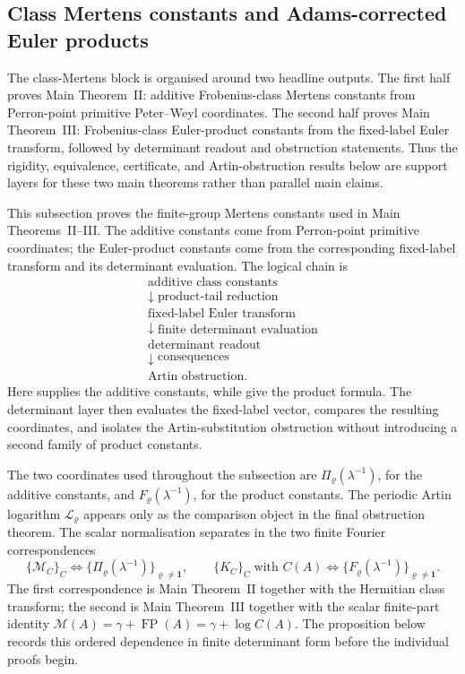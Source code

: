 \documentclass[11pt,a4paper]{amsart}
\theoremstyle{plain}
\theoremstyle{definition}
\theoremstyle{remark}
\DeclareMathOperator{\FP}{FP}
\begin{document}
\subsection{Class Mertens constants and Adams-corrected Euler products}
\label{subsec:class-mertens-adams-products}

The class-Mertens block is organised around two headline outputs.  The first
half proves Main Theorem~II: additive Frobenius-class Mertens constants from
Perron-point primitive Peter--Weyl coordinates.  The second half proves Main
Theorem~III: Frobenius-class Euler-product constants from the fixed-label
Euler transform, followed by determinant readout and obstruction statements.
Thus the rigidity, equivalence, certificate, and Artin-obstruction results
below are support layers for these two main theorems rather than parallel main
claims.

This subsection proves the finite-group Mertens constants used in Main
Theorems~II--III.  The additive constants come from Perron-point primitive
coordinates; the Euler-product constants come from the corresponding
fixed-label transform and its determinant evaluation.  The logical chain is
\[
\begin{array}{c}
  \text{additive class constants}\\
  \downarrow\;\text{product-tail reduction}\\
  \text{fixed-label Euler transform}\\
  \downarrow\;\text{finite determinant evaluation}\\
  \text{determinant readout}\\
  \downarrow\;\text{consequences}\\
  \text{Artin obstruction}.
\end{array}
\]
Here  supplies the additive constants, while
 give the
product formula.  The determinant layer then evaluates the fixed-label vector,
compares the resulting coordinates, and isolates the Artin-substitution
obstruction without introducing a second family of product constants.

The two coordinates used throughout the subsection are
\(\Pi_\varrho(\lambda^{-1})\), for the additive constants, and
\(F_\varrho(\lambda^{-1})\), for the product constants.  The periodic Artin
logarithm \(\mathcal L_\varrho\) appears only as the comparison object in the
final obstruction theorem.  The scalar normalisation separates in the two
finite Fourier correspondences
\[
  \{\mathcal M_C\}_C
  \Longleftrightarrow
  \{\Pi_\varrho(\lambda^{-1})\}_{\varrho\ne\mathbf1},
  \qquad
  \{K_C\}_C\;\text{with }C(A)
  \Longleftrightarrow
  \{F_\varrho(\lambda^{-1})\}_{\varrho\ne\mathbf1}.
\]
The first correspondence is Main Theorem~II together with the Hermitian class
transform; the second is Main Theorem~III together with the scalar finite-part
identity \(\mathcal M(A)=\gamma+\FP(A)=\gamma+\log C(A)\).  The proposition
below records this ordered dependence in finite determinant form before the
individual proofs begin.
\end{document}
